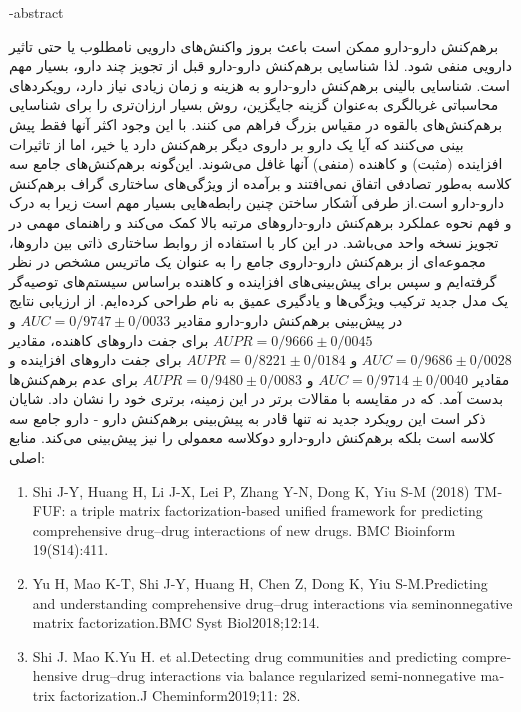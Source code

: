 \fa-abstract{\noindent	
برهم‌کنش دارو-دارو ممکن است باعث بروز واکنش‌های دارویی نامطلوب یا حتی تاثیر دارویی منفی شود. لذا شناسایی برهم‌کنش دارو-دارو قبل از تجویز چند دارو، بسیار مهم است. شناسایی بالینی برهم‌کنش دارو-دارو به هزینه و زمان زیادی نیاز دارد، رویکردهای محاسباتی غربالگری به‌عنوان گزینه جایگزین، روش بسیار ارزان‌تری را برای شناسایی برهم‌کنش‌های بالقوه در مقیاس بزرگ فراهم می کنند. با این وجود اکثر آنها فقط پیش بینی می‌کنند که آیا یک دارو بر داروی دیگر برهم‌کنش دارد یا خیر، اما از تاثیرات افزاینده (مثبت) و کاهنده (منفی) آنها غافل می‌شوند. این‌گونه برهم‌کنش‌های جامع سه کلاسه به‌طور تصادفی اتفاق نمی‌افتند و برآمده از ویژگی‌های ساختاری گراف برهم‌کنش دارو-دارو است.از طرفی آشکار ساختن چنین رابطه‌هایی بسیار مهم است زیرا به درک و فهم نحوه عملکرد برهم‌کنش دارو-داروهای مرتبه بالا کمک می‌کند و راهنمای مهمی در تجویز نسخه واحد می‌باشد.
\newline
در این کار با استفاده از روابط ساختاری ذاتی بین داروها، مجموعه‌ای از برهم‌کنش دارو-داروی جامع را به عنوان یک ماتریس مشخص در نظر گرفته‌ایم و سپس برای پیش‌بینی‌های افزاینده و کاهنده براساس سیستم‌های توصیه‌گر یک مدل جدید ترکیب ویژگی‌ها و یادگیری عمیق به نام
طراحی کرده‌ایم. از ارزیابی نتایج
در پیش‌بینی برهم‌کنش دارو-دارو مقادیر
$AUC=0/9747 \pm 0/0033 $
و
$AUPR=0/9666 \pm 0/0045 $
برای جفت داروهای کاهنده، مقادیر
$AUC=0/9686 \pm 0/0028$
و
$AUPR=0/8221 \pm 0/0184$
برای جفت داروهای افزاینده و مقادیر
$AUC=0/9714 \pm 0/0040$
و
$AUPR=0/9480 \pm 0/0083$
برای عدم برهم‌کنش‌ها بدست آمد. که در مقایسه با مقالات برتر در این زمینه، برتری خود را نشان داد. شایان ذکر است این رویکرد جدید نه تنها قادر به پیش‌بینی برهم‌کنش دارو - دارو جامع سه کلاسه است بلکه برهم‌کنش دارو-دارو دوکلاسه معمولی را نیز پیش‌بینی می‌کند.  
\newline
\newline
\newline
منابع اصلی:
\newline
	\begin{latin}
	\begin{enumerate}
		\item Shi J-Y, Huang H, Li J-X, Lei P, Zhang Y-N, Dong K, Yiu S-M (2018) TMFUF: a triple matrix factorization-based unified framework for predicting comprehensive drug–drug interactions of new drugs. BMC Bioinform 19(S14):411.
		\item Yu H, Mao K-T, Shi J-Y, Huang H, Chen Z, Dong K, Yiu S-M.Predicting and understanding comprehensive drug–drug interactions via seminonnegative matrix factorization.BMC Syst Biol2018;12:14.	
		\item Shi J. Mao K.Yu H. et al.Detecting drug communities and predicting comprehensive drug–drug interactions via balance regularized semi-nonnegative matrix factorization.J Cheminform2019;11: 28.
	\end{enumerate}
	\end{latin}
}


